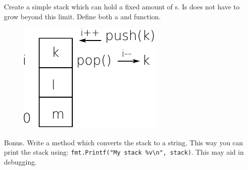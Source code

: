 \begin{Exercise}[title={Stack},difficulty=5]

\label{ex:stack}
\Question \label{ex:stack q1} Create a simple stack which can hold a
fixed amount of s. Is does not have to grow beyond this limit.
Define both a  and  function.
\begin{figure}
\begin{center}
\includegraphics[scale=0.50]{fig/stack.pdf}
\end{center}
\end{figure}

\Question \label{ex:stack q2} Bonus. Write a  method which 
converts the stack to a string. This way you can print the stack using:
\lstinline{fmt.Printf("My stack %v\n", stack)}. This may aid in
debugging.
\end{Exercise}

\begin{Answer}

\Question 

\Question 

\end{Answer}
